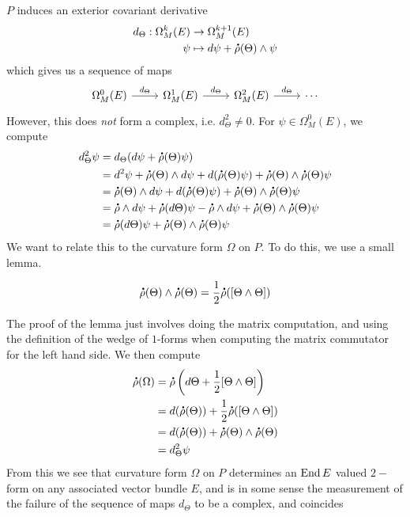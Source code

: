 $P$ induces an exterior covariant derivative
%
\begin{align*}
d_\Theta : \Omega^k_M(E) &\to \Omega^{k+1}_M(E) \\
\psi &\mapsto d\psi + \accentset{\mbox{\large\bfseries .}}{\rho}(\Theta) \wedge \psi
\end{align*}
%
which gives us a sequence of maps
\[\begin{tikzcd}
\Omega^0_M(E) \ar[r, "d_\Theta"] & \Omega^1_M(E) \ar[r, "d_\Theta"]
& \Omega^2_M(E) \ar[r, "d_\Theta"]  & \cdots
\end{tikzcd}\]
However, this does \emph{not} form a complex, i.e. $d_\Theta^2 \neq 0$. For
$\psi \in \Omega^0_M(E)$, we compute
%
\begin{align*}
d_\Theta^2\psi &= d_\Theta(d\psi + \accentset{\mbox{\large\bfseries .}}{\rho}(\Theta)\psi) \\
&= d^2\psi + \accentset{\mbox{\large\bfseries .}}{\rho}(\Theta) \wedge d\psi + d(\accentset{\mbox{\large\bfseries .}}{\rho}(\Theta)\psi)
+ \accentset{\mbox{\large\bfseries .}}{\rho}(\Theta) \wedge \accentset{\mbox{\large\bfseries .}}{\rho}(\Theta)\psi \\
&= \accentset{\mbox{\large\bfseries .}}{\rho}(\Theta) \wedge d\psi + d(\accentset{\mbox{\large\bfseries .}}{\rho}(\Theta)\psi)
+ \accentset{\mbox{\large\bfseries .}}{\rho}(\Theta) \wedge \accentset{\mbox{\large\bfseries .}}{\rho}(\Theta)\psi \\
&= \accentset{\mbox{\large\bfseries .}}{\rho} \wedge d\psi + \accentset{\mbox{\large\bfseries .}}{\rho}(d\Theta)\psi - \accentset{\mbox{\large\bfseries .}}{\rho} \wedge d\psi
+ \accentset{\mbox{\large\bfseries .}}{\rho}(\Theta) \wedge \accentset{\mbox{\large\bfseries .}}{\rho}(\Theta)\psi \\
&= \accentset{\mbox{\large\bfseries .}}{\rho}(d\Theta)\psi + \accentset{\mbox{\large\bfseries .}}{\rho}(\Theta) \wedge \accentset{\mbox{\large\bfseries .}}{\rho}(\Theta)\psi
\end{align*}
%
We want to relate this to the curvature form $\Omega$ on $P$. To do this, we use a
small lemma.
%
\begin{lem}
\[
\accentset{\mbox{\large\bfseries .}}{\rho}(\Theta) \wedge \accentset{\mbox{\large\bfseries .}}{\rho}(\Theta) = \frac{1}{2}\accentset{\mbox{\large\bfseries .}}{\rho}([\Theta \wedge \Theta])
\]
\end{lem}
%
The proof of the lemma just involves doing the matrix computation, and using the
definition of the wedge of $1$-forms when computing the matrix commutator
for the left hand side. We then compute
\begin{align*}
\accentset{\mbox{\large\bfseries .}}{\rho}(\Omega) &= \accentset{\mbox{\large\bfseries .}}{\rho}\left(d\Theta + \frac{1}{2}[\Theta \wedge \Theta]\right) \\
&= d(\accentset{\mbox{\large\bfseries .}}{\rho}(\Theta)) + \frac{1}{2}\accentset{\mbox{\large\bfseries .}}{\rho}([\Theta \wedge \Theta]) \\
&= d(\accentset{\mbox{\large\bfseries .}}{\rho}(\Theta)) + \accentset{\mbox{\large\bfseries .}}{\rho}(\Theta) \wedge \accentset{\mbox{\large\bfseries .}}{\rho}(\Theta) \\
&= d^2_\Theta\psi
\end{align*}
%
From this we see that curvature form $\Omega$ on $P$ determines an $\operatorname{End} E$ valued
$2-$form on any associated vector bundle $E$, and is in some sense the measurement
of the failure of the sequence of maps $d_\Theta$ to be a complex, and coincides

